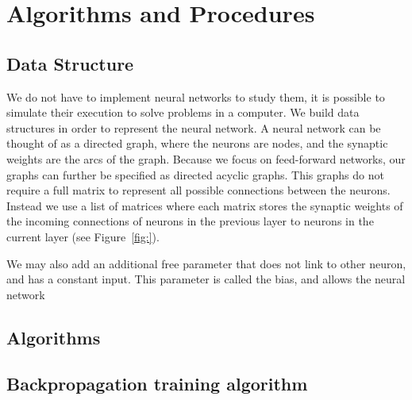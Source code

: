 \documentclass[11pt]{article}
\begin{document}


\section{Algorithms and Procedures} %
\label{sec:algorithms_and_procedures}

\subsection{Data Structure} %
\label{sub:data_structure}

We do not have to implement neural networks to study them, it is possible to simulate their execution to solve problems in a computer.
We build data structures in order to represent the neural network. A neural network can be thought of as a directed graph, where the
neurons are nodes, and the synaptic weights are the arcs of the graph. Because we focus on feed-forward networks, our graphs can further
be specified as directed acyclic graphs. This graphs do not require a full matrix to represent all possible connections between the
neurons. Instead we use a list of matrices where each matrix stores the synaptic weights of the incoming connections of neurons in the
previous layer to neurons in the current layer (see Figure~\ref{fig:}). 

We may also add an additional free parameter that does not link to other neuron, and has a constant input. This parameter is called the bias, and allows the neural network 

\subsection{Algorithms} %
\label{sub:algorithms}

\subsection{Backpropagation training algorithm} %
\label{sub:backpropagation_training_algorithm}
\end{document}
